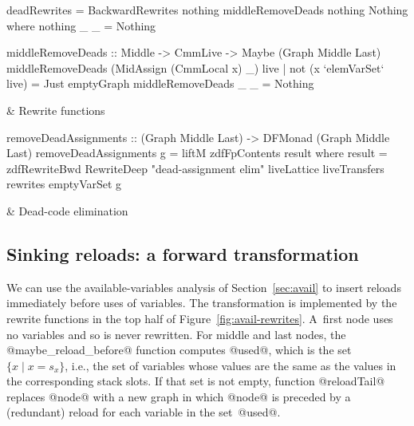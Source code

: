 \documentclass[blockstyle,preprint,nocopyrightspace]{sigplanconf}
\newcommand\slotof[1]{\ensuremath{s_{#1}}}
\newcommand{\authornote}[1]{{\em #1}}
\def\authornote#1{\unskip\relax}
\newcommand{\simon}[1]{\authornote{SLPJ: #1}}
\newcommand\secref[1]{Section~\ref{sec:#1}}
\newcommand\seclabel[1]{\label{sec:#1}}
\newcommand\figref[1]{Figure~\ref{fig:#1}}
\newcommand\figlabel[1]{\label{fig:#1}}
\begin{document}
\begin{figure*}
\begin{codetable}
\T\begin{code}
deadRewrites = BackwardRewrites nothing middleRemoveDeads nothing Nothing
  where nothing _ _ = Nothing

middleRemoveDeads :: Middle -> CmmLive -> Maybe (Graph Middle Last)
middleRemoveDeads (MidAssign (CmmLocal x) _) live
    | not (x `elemVarSet` live) = Just emptyGraph
middleRemoveDeads _ _ = Nothing
\end{code}%
\B
& Rewrite \mbox{functions}\\
\hline

\T\begin{code}
removeDeadAssignments :: (Graph Middle Last) -> DFMonad (Graph Middle Last)
removeDeadAssignments g = liftM zdfFpContents result
     where result = zdfRewriteBwd RewriteDeep "dead-assignment elim"
                                  liveLattice liveTransfers rewrites emptyVarSet g
\end{code}%
& \mbox{Dead-code} elimination\\
\end{codetable}
\caption{Dead-assignment elimination, which relies on the analysis of
\figref{liveness}} 
\figlabel{dead-elim}
\end{figure*}


\subsection{Sinking reloads: a forward transformation}
\simon{Backward reference needed to ``Pass 2 of the algorithm described
in the preamble to Section 4''}

\simon{I believe that in fact we never make the call to @zdfSolveFwd@ given 
in Figure 3?  Instead we pass the transfer functions @avails\_reloads\_transfer@
to @zdfRewriteFwd@?  Whose call is not given in Figure 6. Perhpas we should give
the latter call, and point out that the call in Figure 3 is illustrative and
is not in fact used?}

\simon{Incidentally, I wonder if we should
use record notation when constructing @ForwardRewrites@?}

\seclabel{sink-reloads}

We can use the available-variables analysis of \secref{avail} to
insert reloads
immediately before uses of variables.
The transformation is implemented by the rewrite functions in the top
half of \figref{avail-rewrites}.
A~first node uses no variables and so is never rewritten.
For middle and last nodes, the @maybe_reload_before@ function
computes @used@, which is the set $\{ x \mid x = \slotof x\}$, i.e., 
the set of variables whose values are the same as the values in the
corresponding stack slots.
If that set is not empty, function
@reloadTail@ replaces @node@ with a new graph in which @node@ is
preceded by a (redundant) reload for each variable in the set~@used@.
\end{document}
